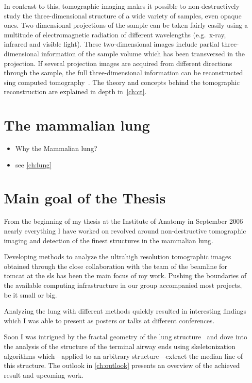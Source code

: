 In contrast to this, tomographic imaging makes it possible to non-destructively study the three-dimensional structure of a wide variety of samples, even opaque ones. Two-dimensional projections of the sample can be taken fairly easily using a multitude of electromagnetic radiation of different wavelengths (e.g.\ x-ray, infrared and visible light). These two-dimensional images include partial three-dimensional information of the sample volume which has been transversed in the projection. If several projection images are acquired from different directions through the sample, the full three-dimensional information can be reconstructed sing computed tomography~\cite{Hounsfield1976a}. The theory and concepts behind the tomographic reconstruction are explained in depth in~\autoref{ch:ct}.

\section{The mammalian lung}
\begin{itemize}
	\item Why the Mammalian lung?
	\item see \autoref{ch:lung}
\end{itemize}

\section{Main goal of the Thesis}
From the beginning of my thesis at the Institute of Anatomy in September 2006 nearly everything I have worked on revolved around non-destructive tomographic imaging and detection of the finest structures in the mammalian lung.

Developing methods to analyze the ultrahigh resolution tomographic images obtained through the close collaboration with the team of the beamline for \ac{tomcat} at the \ac{sls} has been the main focus of my work. Pushing the boundaries of the available computing infrastructure in our group accompanied most projects, be it small or big.

Analyzing the lung with different methods quickly resulted in interesting findings which I was able to present as posters or talks at different conferences.

Soon I was intrigued by the fractal geometry of the lung structure~\cite{Weibel1991,Tsuda2002} and dove into the analysis of the structure of the terminal airway ends using skeletonization algorithms which---applied to an arbitrary structure---extract the median line of this structure. The outlook in \autoref{ch:outlook} presents an overview of the achieved result and upcoming work.

